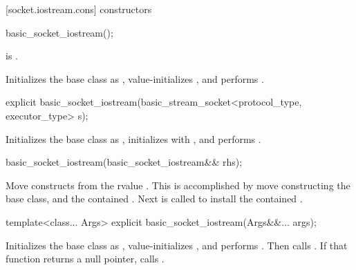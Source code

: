 [socket.iostream.cons]{ constructors}

\begin{itemdecl}
basic_socket_iostream();
\end{itemdecl}

\begin{itemdescr}
\pnum
\constraints
{} is .

\pnum
\effects Initializes the base class as , value-initializes , and performs .
\end{itemdescr}

\begin{itemdecl}
explicit basic_socket_iostream(basic_stream_socket<protocol_type, executor_type> s);
\end{itemdecl}

\begin{itemdescr}
\pnum
\effects Initializes the base class as , initializes  with , and performs .
\end{itemdescr}

\begin{itemdecl}
basic_socket_iostream(basic_socket_iostream&& rhs);
\end{itemdecl}

\begin{itemdescr}
\pnum
\effects Move constructs from the rvalue . This is accomplished by move constructing the base class, and the contained . Next  is called to install the contained .
\end{itemdescr}

\begin{itemdecl}
template<class... Args>
  explicit basic_socket_iostream(Args&&... args);
\end{itemdecl}


\begin{itemdescr}
\pnum
\effects Initializes the base class as , value-initializes , and performs . Then calls . If that function returns a null pointer, calls .
\end{itemdescr}

